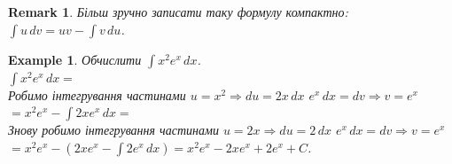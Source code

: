 \documentclass[a4paper, 10pt]{article}
\def\huge{\displaystyle}
\theoremstyle{theoremdd}
\theoremstyle{theoremdd}
\theoremstyle{theoremdd}
\theoremstyle{theoremdd}
\theoremstyle{theoremdd}
\newtheorem{example}[theorem]{Example}
\theoremstyle{theoremdd}
\theoremstyle{theoremdd}
\newtheorem{remark}[theorem]{Remark}
\theoremstyle{theoremdd}
\theoremstyle{theoremdd}
\begin{document}
\begin{remark}
Більш зручно записати таку формулу компактно: $\huge \int u\,dv = uv - \int v\,du$.
\end{remark}

\begin{example}
Обчислити $\huge \int x^2 e^x \,dx$.\\
$\huge \int x^2 e^x \,dx \boxed{=}$\\
Робимо інтегрування частинами $u = x^2 \Rightarrow du = 2x\,dx$ \hspace{1cm} $e^x\,dx = dv \Rightarrow v = e^x$\\
$\boxed{=} x^2 e^x - \huge \int 2x e^x\,dx \boxed{\boxed{=}}$\\
Знову робимо інтегрування частинами $u = 2x \Rightarrow du = 2\,dx$ \hspace{1cm} $e^x\,dx = dv \Rightarrow v = e^x$\\
$\boxed{\boxed{=}} x^2 e^x - (2xe^x - \huge \int 2e^x \,dx) = x^2 e^x - 2xe^x + 2e^x + C$.
\end{example}
\end{document}
